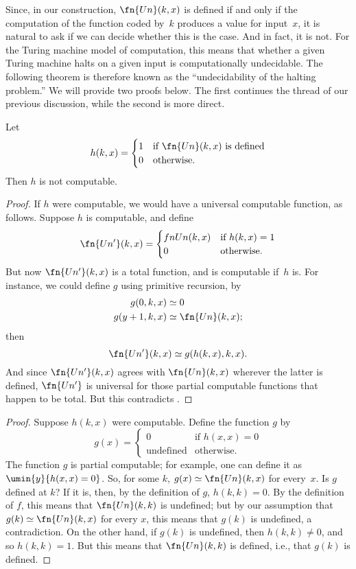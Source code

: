 \documentclass[../../../include/open-logic-section]{subfiles}
\begin{document}

Since, in our construction, $\fn{Un}(k,x)$ is defined if and only if
the computation of the function coded by~$k$ produces a value for
input~$x$, it is natural to ask if we can decide whether this is the
case. And in fact, it is not. For the Turing machine model of
computation, this means that whether a given Turing
machine halts on a given input is computationally undecidable. The
following theorem is therefore known as the ``undecidability of the
halting problem.'' We will provide two proofs below. The first
continues the thread of our previous discussion, while the second is
more direct.

\begin{thm}
Let
\[
h(k, x)  =
\begin{cases}
1 & \text{if $\fn{Un}(k,x)$ is defined} \\
0 & \text{otherwise.}
\end{cases}
\]
Then $h$ is not computable.
\end{thm}

\begin{proof}
If $h$ were computable, we would have a universal computable function,
as follows. Suppose $h$ is computable, and define
\[
\fn{Un'}(k,x) =
\begin{cases}
fn{Un}(k,x) & \text{if $h(k,x) = 1$} \\
0 & \text{otherwise.}
\end{cases}
\]
But now $\fn{Un'}(k, x)$ is a total function, and is computable if~$h$
is.  For instance, we could define $g$ using primitive recursion, by
\begin{align*}
g(0, k, x) & \simeq 0 \\
g(y+1, k, x) & \simeq \fn{Un}(k,x);
\end{align*}
then
\[
\fn{Un'}(k,x) \simeq g(h(k,x),k,x).
\]
And since $\fn{Un'}(k,x)$ agrees with $\fn{Un}(k,x)$ wherever the
latter is defined, $\fn{Un'}$ is universal for those partial
computable functions that happen to be total.  But this contradicts
.
\end{proof}

\begin{proof}
Suppose $h(k,x)$ were computable. Define the function $g$ by
\[
g(x) =
\begin{cases}
  0                & \text{if $h(x,x) = 0$} \\
  \text{undefined} & \text{otherwise.}
\end{cases}
\]
The function $g$ is partial computable; for example, one can define it
as $\umin{y}{h(x,x) = 0}$. So, for some $k$, $g(x) \simeq \fn{Un}(k, x)$ for
every~$x$. Is $g$ defined at $k$?  If it is, then, by the definition
of $g$, $h(k,k) = 0$. By the definition of $f$, this means that
$\fn{Un}(k, k)$ is undefined; but by our assumption that $g(k) \simeq
\fn{Un}(k, x)$ for every $x$, this means that $g(k)$ is undefined, a
contradiction. On the other hand, if $g(k)$ is undefined, then $h(k,k)
\neq 0$, and so $h(k,k) = 1$. But this means that $\fn{Un}(k, k)$ is
defined, i.e., that $g(k)$ is defined.
\end{proof}
\end{document}
